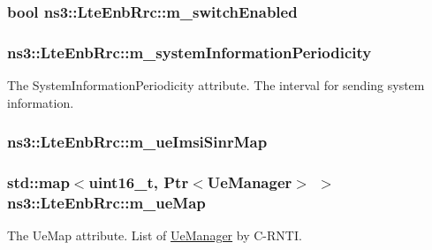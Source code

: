 \subsubsection[{\texorpdfstring{m\+\_\+switch\+Enabled}{m_switchEnabled}}]{\setlength{\rightskip}{0pt plus 5cm}bool ns3\+::\+Lte\+Enb\+Rrc\+::m\+\_\+switch\+Enabled\hspace{0.3cm}{\ttfamily [private]}}\hypertarget{classns3_1_1LteEnbRrc_a1d1c4218f9e1c0b4b3e2605949138f06}{}\label{classns3_1_1LteEnbRrc_a1d1c4218f9e1c0b4b3e2605949138f06}
\subsubsection[{\texorpdfstring{m\+\_\+system\+Information\+Periodicity}{m_systemInformationPeriodicity}}]{ ns3\+::\+Lte\+Enb\+Rrc\+::m\+\_\+system\+Information\+Periodicity\hspace{0.3cm}{\ttfamily [private]}}\hypertarget{classns3_1_1LteEnbRrc_a9f7be69996d0a982b8ae5129c0c3b1af}{}\label{classns3_1_1LteEnbRrc_a9f7be69996d0a982b8ae5129c0c3b1af}
The {\ttfamily System\+Information\+Periodicity} attribute. The interval for sending system information. 
\subsubsection[{\texorpdfstring{m\+\_\+ue\+Imsi\+Sinr\+Map}{m_ueImsiSinrMap}}]{ ns3\+::\+Lte\+Enb\+Rrc\+::m\+\_\+ue\+Imsi\+Sinr\+Map\hspace{0.3cm}{\ttfamily [private]}}\hypertarget{classns3_1_1LteEnbRrc_ace21a7a862af010882cbfd9f8ccdcfd2}{}\label{classns3_1_1LteEnbRrc_ace21a7a862af010882cbfd9f8ccdcfd2}
\subsubsection[{\texorpdfstring{m\+\_\+ue\+Map}{m_ueMap}}]{\setlength{\rightskip}{0pt plus 5cm}std\+::map$<$uint16\+\_\+t, {\bf Ptr}$<${\bf Ue\+Manager}$>$ $>$ ns3\+::\+Lte\+Enb\+Rrc\+::m\+\_\+ue\+Map\hspace{0.3cm}{\ttfamily [private]}}\hypertarget{classns3_1_1LteEnbRrc_a7cf28bbc2890b86221ed1d901da8ad73}{}\label{classns3_1_1LteEnbRrc_a7cf28bbc2890b86221ed1d901da8ad73}
The {\ttfamily Ue\+Map} attribute. List of \hyperlink{classns3_1_1UeManager}{Ue\+Manager} by C-\/\+R\+N\+TI. 
